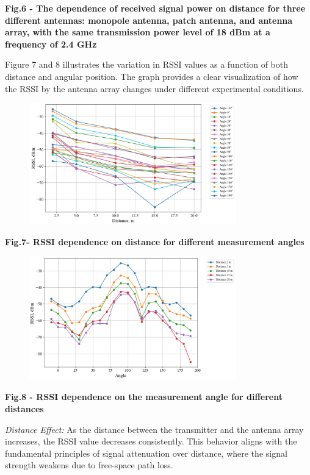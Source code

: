 {\bfseries Fig.6 - The dependence of received signal power on distance for
three different antennas: monopole antenna, patch antenna, and antenna
array, with the same transmission power level of 18 dBm at a frequency
of 2.4 GHz}

Figure 7 and 8 illustrates the variation in RSSI values as a function of
both distance and angular position. The graph provides a clear
visualization of how the RSSI by the antenna array changes under
different experimental conditions.


\begin{figure}[H]
	\centering
	\includegraphics[width=0.8\textwidth]{media/ict/image47}
	\caption*{}
\end{figure}


{\bfseries Fig.7- RSSI dependence on distance for different measurement
angles}


\begin{figure}[H]
	\centering
	\includegraphics[width=0.8\textwidth]{media/ict/image48}
	\caption*{}
\end{figure}


{\bfseries Fig.8 - RSSI dependence on the measurement angle for different
distances}

\emph{Distance Effect:} As the distance between the transmitter and the
antenna array increases, the RSSI value decreases consistently. This
behavior aligns with the fundamental principles of signal attenuation
over distance, where the signal strength weakens due to free-space path
loss.

